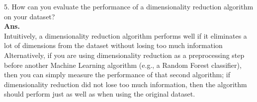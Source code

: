 \documentclass[a4paper, 11pt]{article}
\begin{document}
5. How can you evaluate the performance of a dimensionality reduction algorithm on your dataset?
\\ \textbf{Ans. } \\
Intuitively, a dimensionality reduction algorithm performs well if it eliminates a 
lot of dimensions from the dataset without losing too much information \\ Alternatively, if you are using dimensionality reduction as a preprocessing step before another Machine Learning algorithm (e.g., a Random Forest classifier), then you can simply measure the performance of that second algorithm; if dimensionality reduction did not lose too much information, then the algorithm should perform just as well as when using the original dataset.


\end{document}
